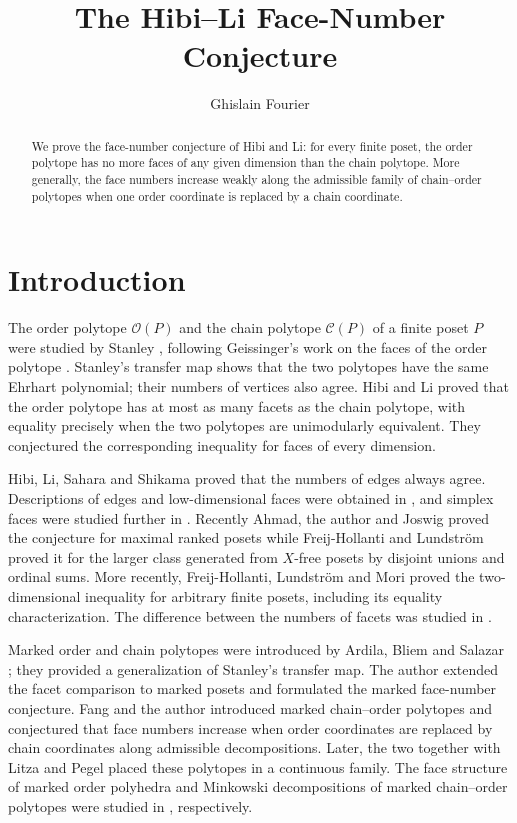 \documentclass[a4paper,12pt]{amsart}
\title{The Hibi--Li Face-Number Conjecture}
\author{Ghislain Fourier}
\theoremstyle{definition}
\theoremstyle{remark}
\begin{document}
\begin{abstract}
We prove the face-number conjecture of Hibi and Li: for every finite poset, the order polytope has no more faces of any given dimension than the chain polytope. 
More generally, the face numbers increase weakly along the admissible family of chain--order polytopes when one order coordinate is replaced by a chain coordinate.

\end{abstract}
\maketitle
\section{Introduction}

The order polytope $\mathcal O(P)$ and the chain polytope $\mathcal C(P)$ of a finite poset $P$ were studied by Stanley \cite{Sta86}, following Geissinger's work on the faces of the order polytope \cite{Gei81}. 
Stanley's transfer map shows that the two polytopes have the same Ehrhart polynomial; their numbers of vertices also agree. 
Hibi and Li \cite{HL16} proved that the order polytope has at most as many facets as the chain polytope, with equality precisely when the two polytopes are unimodularly equivalent. 
They conjectured the corresponding inequality for faces of every dimension. 

Hibi, Li, Sahara and Shikama \cite{Hib+17} proved that the numbers of edges always agree. 
Descriptions of edges and low-dimensional faces were obtained in \cite{HL19,Mor19}, and simplex faces were studied further in \cite{Mor25a,Mor25b,FL26}. 
Recently Ahmad, the author and Joswig
\cite{AFJ26} proved the conjecture for maximal ranked posets while Freij-Hollanti and Lundstr\"om \cite{FL24} proved it for the larger class generated from $X$-free posets by disjoint unions and ordinal sums. 
More recently, Freij-Hollanti, Lundstr\"om and Mori \cite{FLM26} proved the two-dimensional inequality for arbitrary finite posets, including its equality characterization. 
The difference between the numbers of facets was studied in
\cite{Bha+25,Fou26}.

Marked order and chain polytopes were introduced by Ardila, Bliem and Salazar \cite{ABS11}; they provided a generalization of Stanley's transfer map.
The author \cite{Fou16} extended the facet comparison to marked posets and formulated the marked face-number conjecture. 
Fang and the author \cite{FF16} introduced marked chain--order polytopes and conjectured that face numbers increase when order coordinates are replaced by chain coordinates along admissible decompositions. 
Later, the two together with Litza and Pegel \cite{Fan+20} placed these polytopes in a continuous family. 
The face structure of marked order polyhedra and Minkowski decompositions of marked chain--order polytopes were studied in \cite{Peg18,FFP20}, respectively.
\end{document}
